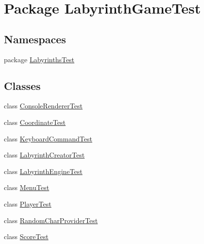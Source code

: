 \hypertarget{namespace_labyrinth_game_test}{\section{Package Labyrinth\+Game\+Test}
\label{namespace_labyrinth_game_test}
}
\subsection*{Namespaces}
\begin{DoxyCompactItemize}
\item 
package \hyperlink{namespace_labyrinth_game_test_1_1_labyrinths_test}{Labyrinths\+Test}
\end{DoxyCompactItemize}
\subsection*{Classes}
\begin{DoxyCompactItemize}
\item 
class \hyperlink{class_labyrinth_game_test_1_1_console_renderer_test}{Console\+Renderer\+Test}
\item 
class \hyperlink{class_labyrinth_game_test_1_1_coordinate_test}{Coordinate\+Test}
\item 
class \hyperlink{class_labyrinth_game_test_1_1_keyboard_command_test}{Keyboard\+Command\+Test}
\item 
class \hyperlink{class_labyrinth_game_test_1_1_labyrinth_creator_test}{Labyrinth\+Creator\+Test}
\item 
class \hyperlink{class_labyrinth_game_test_1_1_labyrinth_engine_test}{Labyrinth\+Engine\+Test}
\item 
class \hyperlink{class_labyrinth_game_test_1_1_menu_test}{Menu\+Test}
\item 
class \hyperlink{class_labyrinth_game_test_1_1_player_test}{Player\+Test}
\item 
class \hyperlink{class_labyrinth_game_test_1_1_random_char_provider_test}{Random\+Char\+Provider\+Test}
\item 
class \hyperlink{class_labyrinth_game_test_1_1_score_test}{Score\+Test}
\end{DoxyCompactItemize}
